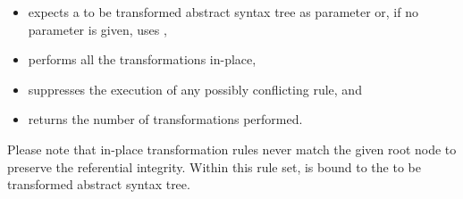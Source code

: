 \begin{itemize}
   \item expects a to be transformed abstract syntax tree
      as parameter or, if no parameter is given, uses ,
   \item performs all the transformations in-place,
   \item suppresses the execution of any possibly conflicting rule, and
   \item returns the number of transformations performed.
\end{itemize}

Please note that in-place transformation rules never match the
given root node to preserve the referential integrity.
Within this rule set,  is bound to the
to be transformed abstract syntax tree.

\begin{grammar}
      \produces {}
	  
	  \nextline
	 \lextoken{\{} 
	 \lextoken{\}}
\end{grammar}

\endinput
